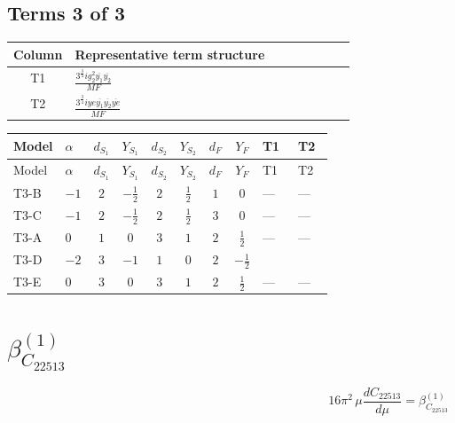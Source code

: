 \documentclass[8pt]{article}
\begin{document}
\begin{landscape}
\subsection*{Terms 3 of 3}
\begin{center}
\begin{tabular}{@{}c >{\raggedright\arraybackslash}p{0.82\linewidth}@{}}
\toprule
Column & Representative term structure \\
\midrule
T1 & \(\displaystyle \frac{3^{\frac{3}{4}} i g_{2}^{2} \overline{y_{1}} \overline{y_{2}}}{MF}\) \\
\midrule
T2 & \(\displaystyle \frac{3^{\frac{3}{4}} i ye \overline{y_{1}} \overline{y_{2}} \overline{ye}}{MF}\) \\
\midrule
\bottomrule
\end{tabular}
\end{center}
\smallskip
\tiny
\begin{longtable}{@{}llcccccc >{\raggedright\arraybackslash}p{0.21\linewidth} >{\raggedright\arraybackslash}p{0.21\linewidth}@{}}
\toprule
Model & $\alpha$ & $d_{S_1}$ & $Y_{S_1}$ & $d_{S_2}$ & $Y_{S_2}$ & $d_F$ & $Y_F$ & T1 & T2 \\
\midrule
\endfirsthead
\toprule
Model & $\alpha$ & $d_{S_1}$ & $Y_{S_1}$ & $d_{S_2}$ & $Y_{S_2}$ & $d_F$ & $Y_F$ & T1 & T2 \\
\midrule
\endhead
T3-B & $-1$ & $2$ & $-\frac{1}{2}$ & $2$ & $\frac{1}{2}$ & $1$ & $0$ & --- & --- \\
\midrule
T3-C & $-1$ & $2$ & $-\frac{1}{2}$ & $2$ & $\frac{1}{2}$ & $3$ & $0$ & --- & --- \\
\midrule
T3-A & $0$ & $1$ & $0$ & $3$ & $1$ & $2$ & $\frac{1}{2}$ & --- & --- \\
\midrule
T3-D & $-2$ & $3$ & $-1$ & $1$ & $0$ & $2$ & $-\frac{1}{2}$ & \scriptsize\adjustbox{max width=\linewidth}{$\begin{gathered} \frac{11 \cdot 3^{\frac{3}{4}} i g_{2}^{2} \overline{y_{1}} \overline{y_{2}}}{8 MF}\end{gathered}$} & \scriptsize\adjustbox{max width=\linewidth}{$\begin{gathered} - \frac{3^{\frac{3}{4}} i ye \overline{y_{1}} \overline{y_{2}} \overline{ye}}{12 MF}\end{gathered}$} \\
\midrule
T3-E & $0$ & $3$ & $0$ & $3$ & $1$ & $2$ & $\frac{1}{2}$ & --- & --- \\
\midrule
\bottomrule
\end{longtable}
\clearpage
\section*{$\beta_{C_{22513}}^{(1)}$}
\[16\pi^2\,\mu\frac{d C_{22513}}{d\mu}=\beta_{C_{22513}}^{(1)}\]

\end{landscape}
\end{document}
